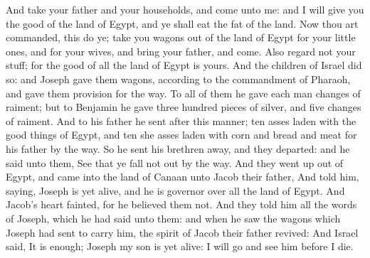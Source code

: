 \begin{biblechapter}
\verse And take your father and your households, and come unto me: and I will give you the good of the land of Egypt, and ye shall eat the fat of the land.
\verse Now thou art commanded, this do ye; take you wagons out of the land of Egypt for your little ones, and for your wives, and bring your father, and come.
\verse Also regard not your stuff; for the good of all the land of Egypt is yours.
\verse And the children of Israel did so: and Joseph gave them wagons, according to the commandment of Pharaoh, and gave them provision for the way.
\verse To all of them he gave each man changes of raiment; but to Benjamin he gave three hundred pieces of silver, and five changes of raiment.
\verse And to his father he sent after this manner; ten asses laden with the good things of Egypt, and ten she asses laden with corn and bread and meat for his father by the way.
\verse So he sent his brethren away, and they departed: and he said unto them, See that ye fall not out by the way.
\verse And they went up out of Egypt, and came into the land of Canaan unto Jacob their father,
\verse And told him, saying, Joseph is yet alive, and he is governor over all the land of Egypt. And Jacob's heart fainted, for he believed them not.
\verse And they told him all the words of Joseph, which he had said unto them: and when he saw the wagons which Joseph had sent to carry him, the spirit of Jacob their father revived:
\verse And Israel said, It is enough; Joseph my son is yet alive: I will go and see him before I die.
\end{biblechapter}

